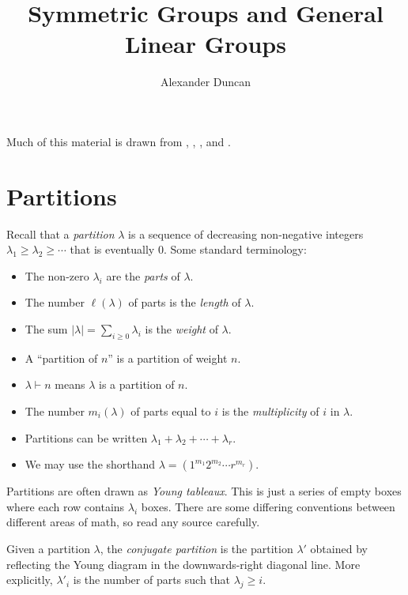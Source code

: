 \documentclass[12pt]{article}
\theoremstyle{plain}
\theoremstyle{definition}
\theoremstyle{remark}
\numberwithin{equation}{section}
\begin{document}
\title{Symmetric Groups and General Linear Groups}
\author{Alexander Duncan}

\maketitle

Much of this material is drawn from
\cite[\S{4,6,A}]{FultonHarris},
\cite[\S{5.12--5.19}]{Etingof},
\cite[\S{I}]{Macdonald}, and
\cite[\S{7}]{Stanley2}.


\section{Partitions}

Recall that a \emph{partition} $\lambda$ is a sequence of decreasing
non-negative integers
$\lambda_1 \ge \lambda_2 \ge \cdots$ that is eventually $0$.
Some standard terminology:
\begin{itemize}
\item The non-zero $\lambda_i$ are the \emph{parts} of $\lambda$.
\item The number $\ell(\lambda)$ of parts is the \emph{length} of $\lambda$.
\item The sum $|\lambda|=\sum_{i \ge 0} \lambda_i$ is the \emph{weight} of $\lambda$.
\item A ``partition of $n$'' is a partition of weight $n$.
\item $\lambda \vdash n$ means $\lambda$ is a partition of $n$.
\item The number $m_i(\lambda)$ of parts equal to $i$ is
the \emph{multiplicity} of $i$ in $\lambda$.
\item Partitions can be written $\lambda_1 + \lambda_2 + \cdots + \lambda_r$.
\item We may use the shorthand $\lambda = (1^{m_1} 2^{m_2} \cdots r^{m_r})$.
\end{itemize}

Partitions are often drawn as \emph{Young tableaux}.  This is just a
series of empty boxes where each row contains $\lambda_i$ boxes.
There are some differing conventions between different areas of math, so
read any source carefully.

Given a partition $\lambda$, the \emph{conjugate partition}
is the partition $\lambda'$ obtained by reflecting the Young diagram in
the downwards-right diagonal line.  More explicitly,
$\lambda'_i$ is the number of parts such that $\lambda_j \ge i$. 
\end{document}
